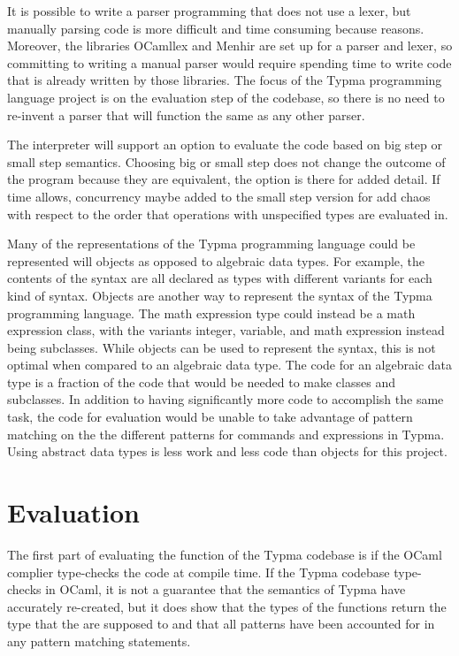 \documentclass[10pt,twocolumn]{article}
\begin{document}
It is possible to write a parser programming that does not use a lexer, but manually parsing code is more difficult and time consuming because reasons. Moreover, the libraries OCamllex and Menhir are set up for a parser and lexer, so committing to writing a manual parser would require spending time to write code that is already written by those libraries. The focus of the Typma programming language project is on the evaluation step of the codebase, so there is no need to re-invent a parser that will function the same as any other parser.

The interpreter will support an option to evaluate the code based on big step or small step semantics. Choosing big or small step does not change the outcome of the program because they are equivalent, the option is there for added detail. If time allows, concurrency maybe added to the small step version for add chaos with respect to the order that operations with unspecified types are evaluated in.

Many of the representations of the Typma programming language could be represented will objects as opposed to algebraic data types. For example, the contents of the syntax are all declared as types with different variants for each kind of syntax. Objects are another way to represent the syntax of the Typma programming language. The math expression type could instead be a math expression class, with the variants integer, variable, and math expression instead being subclasses. While objects can be used to represent the syntax, this is not optimal when compared to an algebraic data type. The code for an algebraic data type is a fraction of the code that would be needed to make classes and subclasses. In addition to having significantly more code to accomplish the same task, the code for evaluation would be unable to take advantage of pattern matching on the the different patterns for commands and expressions in Typma. Using abstract data types is less work and less code than objects for this project.

\section{Evaluation} 

The first part of evaluating the function of the Typma codebase is if the OCaml complier type-checks the code at compile time. If the Typma codebase type-checks in OCaml, it is not a guarantee that the semantics of Typma have accurately re-created, but it does show that the types of the functions return the type that the are supposed to and that all patterns have been accounted for in any pattern matching statements.
\end{document}
